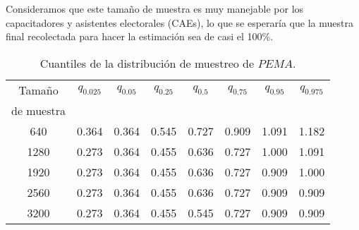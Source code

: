 \documentclass[]{article}
\begin{document}
Consideramos que este tamaño de muestra es muy manejable por los capacitadores y asistentes electorales (CAEs), lo que se esperaría que la muestra final recolectada para hacer la estimación sea de casi el 100\%. 

\bigskip 



\begin{table}[ht]
\centering
\begin{tabular}{cccccccc}
\toprule
Tamaño & $q_{0.025}$ & $q_{0.05}$ & $q_{0.25}$ & $q_{0.5}$ & $q_{0.75}$ & $q_{0.95}$ & $q_{0.975}$\\
de muestra & \\
\midrule

640 & 0.364 & 0.364 & 0.545 & 0.727 & 0.909 & 1.091 & 1.182\\

1280 & 0.273 & 0.364 & 0.455 & 0.636 & 0.727 & 1.000 & 1.091\\

1920 & 0.273 & 0.364 & 0.455 & 0.636 & 0.727 & 0.909 & 1.000\\

2560 & 0.273 & 0.364 & 0.455 & 0.636 & 0.727 & 0.909 & 0.909\\

3200 & 0.273 & 0.364 & 0.455 & 0.545 & 0.727 & 0.909 & 0.909\\

\bottomrule
\end{tabular}
\caption{Cuantiles de la distribución de muestreo de $PEMA$.}
\label{tab:cuantiles_pema}
\end{table}
\end{document}
